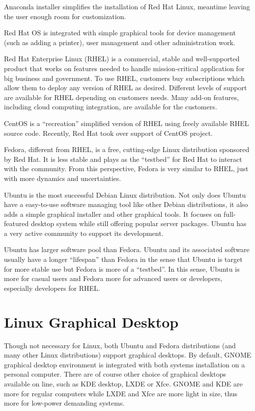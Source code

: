 Anaconda installer simplifies the installation of Red Hat Linux, meantime leaving the user enough room for customization.

Red Hat OS is integrated with simple graphical tools for device management (such as adding a printer), user management and other administration work.

Red Hat Enterprise Linux (RHEL) is a commercial, stable and well-supported product that works on features needed to handle mission-critical application for big business and government. To use RHEL, customers buy subscriptions which allow them to deploy any version of RHEL as desired. Different levels of support are available for RHEL depending on customers needs. Many add-on features, including cloud computing integration, are available for the customers.

CentOS is a ``recreation'' simplified version of RHEL using freely available RHEL source code. Recently, Red Hat took over support of CentOS project. 

Fedora, different from RHEL, is a free, cutting-edge Linux distribution sponsored by Red Hat. It is less stable and plays as the ``testbed'' for Red Hat to interact with the community. From this perspective, Fedora is very similar to RHEL, just with more dynamics and uncertainties.

Ubuntu is the most successful Debian Linux distribution. Not only does Ubuntu have a easy-to-use software managing tool like other Debian distributions, it also adds a simple graphical installer and other graphical tools. It focuses on full-featured desktop system while still offering popular server packages. Ubuntu has a very active community to support its development.

Ubuntu has larger software pool than Fedora. Ubuntu and its associated software usually have a longer ``lifespan'' than Fedora in the sense that Ubuntu is target for more stable use but Fedora is more of a ``testbed''. In this sense, Ubuntu is more for casual users and Fedora more for advanced users or developers, especially developers for RHEL.

\section{Linux Graphical Desktop}

Though not necessary for Linux, both Ubuntu and Fedora distributions (and many other Linux distributions) support graphical desktops. By default, GNOME graphical desktop environment is integrated with both systems installation on a personal computer. There are of course other choice of graphical desktops available on line, such as KDE desktop, LXDE or Xfce. GNOME and KDE are more for regular computers while LXDE and Xfce are more light in size, thus more for low-power demanding systems.

